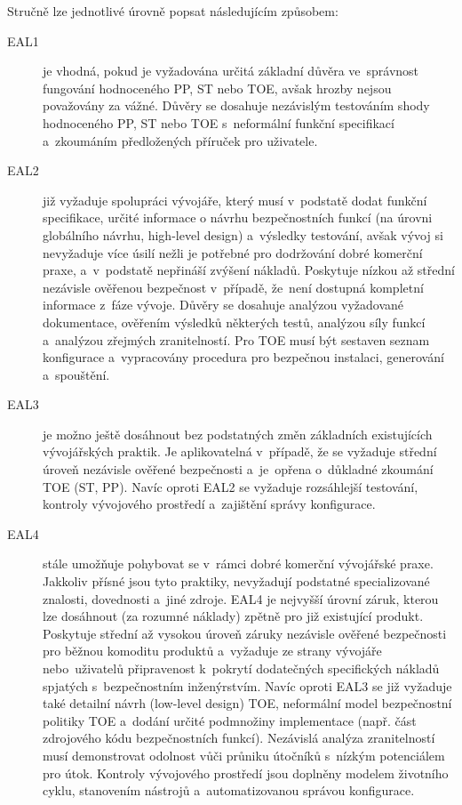 \documentclass[a4paper,12pt]{article}
\begin{document}
Stručně lze jednotlivé úrovně popsat následujícím způsobem:
\begin{description}
 \item[EAL1] je vhodná, pokud je vyžadována určitá základní důvěra ve~správnost fungování hodnoceného PP, ST nebo TOE, avšak hrozby nejsou považovány za vážné. Důvěry se dosahuje nezávislým testováním shody hodnoceného PP, ST nebo TOE s~neformální funkční specifikací a~zkoumáním předložených příruček pro uživatele.~\cite{NBUHodnoceniBezpecnostiSW}
 \item[EAL2] již vyžaduje spolupráci vývojáře, který musí v~podstatě dodat funkční specifikace, určité informace o návrhu bezpečnostních funkcí (na úrovni globálního návrhu, high-level design) a~výsledky testování, avšak vývoj si nevyžaduje více úsilí nežli je potřebné pro dodržování dobré komerční praxe, a~v~podstatě nepřináší zvýšení nákladů. Poskytuje nízkou až střední nezávisle ověřenou bezpečnost v~případě, že~není dostupná kompletní informace z~fáze vývoje. Důvěry se dosahuje analýzou vyžadované dokumentace, ověřením výsledků některých testů, analýzou síly funkcí a~analýzou zřejmých zranitelností. Pro TOE musí být sestaven seznam konfigurace a~vypracovány procedura pro bezpečnou instalaci, generování a~spouštění.~\cite{NBUHodnoceniBezpecnostiSW}
 \item[EAL3] je možno ještě dosáhnout bez podstatných změn základních existujících vývojářských praktik. Je aplikovatelná v~případě, že se vyžaduje střední úroveň nezávisle ověřené bezpečnosti a~je~opřena o~důkladné zkoumání TOE (ST, PP). Navíc oproti EAL2 se vyžaduje rozsáhlejší testování, kontroly vývojového prostředí a~zajištění správy konfigurace.~\cite{NBUHodnoceniBezpecnostiSW}
 \item[EAL4] stále umožňuje pohybovat se v~rámci dobré komerční vývojářské praxe. Jakkoliv přísné jsou tyto praktiky, nevyžadují podstatné specializované znalosti, dovednosti a~jiné zdroje. EAL4 je nejvyšší úrovní záruk, kterou lze dosáhnout (za rozumné náklady) zpětně pro již existující produkt. Poskytuje střední až vysokou úroveň záruky nezávisle ověřené bezpečnosti pro běžnou komoditu produktů a~vyžaduje ze strany vývojáře nebo~uživatelů připravenost k~pokrytí dodatečných specifických nákladů spjatých s~bezpečnostním inženýrstvím. Navíc oproti EAL3 se již vyžaduje také detailní návrh (low-level design) TOE, neformální model bezpečnostní politiky TOE a~dodání určité podmnožiny implementace (např. část zdrojového kódu bezpečnostních funkcí). Nezávislá analýza zranitelností musí demonstrovat odolnost vůči průniku útočníků s~nízkým potenciálem pro útok. Kontroly vývojového prostředí jsou doplněny modelem životního cyklu, stanovením nástrojů a~automatizovanou správou konfigurace.~\cite{NBUHodnoceniBezpecnostiSW}

\end{description}
\end{document}
